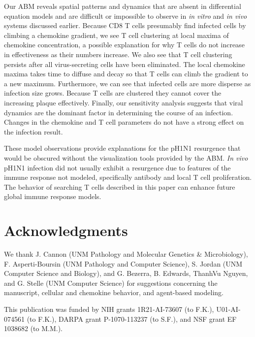 \documentclass[10pt]{article}
\begin{document}
Our ABM reveals spatial patterns and dynamics that are absent in differential equation models and are difficult or impossible to observe in \textit{in vitro} and \textit{in vivo} systems discussed earlier.  Because CD8 T cells presumably find infected cells by climbing a chemokine gradient, we see T cell clustering at local maxima of chemokine concentration, a possible explanation for why T cells do not increase in effectiveness as their numbers increase.   We also see that T cell clustering persists after all virus-secreting cells have been eliminated.  The local chemokine maxima takes time to diffuse and decay so that T cells can climb the gradient to a new maximum.  Furthermore, we can see that infected cells are more disperse as infection size grows.  Because T cells are clustered they cannot cover the increasing plaque effectively.  Finally, our sensitivity analysis suggests that viral dynamics are the dominant factor in determining the course of an infection.  Changes in the chemokine and T cell parameters do not have a strong effect on the infection result.


These model observations provide explanations for the pH1N1 resurgence that would be obscured without the visualization tools provided by the ABM.   \textit{In vivo} pH1N1 infection did not usually exhibit a resurgence due to features of the immune response not modeled, specifically antibody and local T cell proliferation.   The behavior of searching T cells described in this paper can enhance future global immune response models.




\section*{Acknowledgments}

We thank J. Cannon (UNM Pathology and Molecular Genetics \& Microbiology), F. Asperti-Boursin (UNM Pathology and Computer Science), S. Jordan (UNM Computer Science and Biology), and G. Bezerra, B. Edwards, ThanhVu Nguyen, and G. Stelle (UNM Computer Science) for suggestions concerning the manuscript, cellular and chemokine behavior, and agent-based modeling.

This publication was funded by NIH grants 1R21-AI-73607 (to F.K.), U01-AI-074561 (to F.K.), DARPA grant P-1070-113237 (to S.F.), and NSF grant EF 1038682 (to M.M.).


\end{document}
